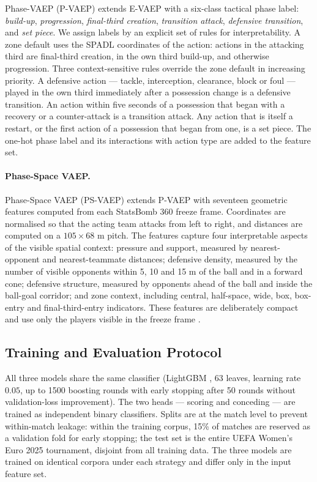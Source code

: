 \documentclass[runningheads]{llncs}
\begin{document}
Phase-VAEP (P-VAEP) extends E-VAEP with a six-class tactical phase label: \emph{build-up}, \emph{progression}, \emph{final-third creation}, \emph{transition attack}, \emph{defensive transition}, and \emph{set piece}. We assign labels by an explicit set of rules for interpretability. A zone default uses the SPADL coordinates of the action: actions in the attacking third are final-third creation, in the own third build-up, and otherwise progression. Three context-sensitive rules override the zone default in increasing priority. A defensive action --- tackle, interception, clearance, block or foul --- played in the own third immediately after a possession change is a defensive transition. An action within five seconds of a possession that began with a recovery or a counter-attack is a transition attack. Any action that is itself a restart, or the first action of a possession that began from one, is a set piece. The one-hot phase label and its interactions with action type are added to the feature set.

\paragraph{\textbf{Phase-Space VAEP.}}
\label{sec:spatial}

Phase-Space VAEP (PS-VAEP) extends P-VAEP with seventeen geometric features computed from each StatsBomb 360 freeze frame. Coordinates are normalised so that the acting team attacks from left to right, and distances are computed on a $105 \times 68$ m pitch. The features capture four interpretable aspects of the visible spatial context: pressure and support, measured by nearest-opponent and nearest-teammate distances; defensive density, measured by the number of visible opponents within 5, 10 and 15 m of the ball and in a forward cone; defensive structure, measured by opponents ahead of the ball and inside the ball-goal corridor; and zone context, including central, half-space, wide, box, box-entry and final-third-entry indicators. These features are deliberately compact and use only the players visible in the freeze frame \cite{statsbomb2021freezeframe}.


\subsection{Training and Evaluation Protocol}

All three models share the same classifier (LightGBM \cite{ke2017lightgbm}, 63 leaves, learning rate $0.05$, up to 1500 boosting rounds with early stopping after 50 rounds without validation-loss improvement). The two heads --- scoring and conceding --- are trained as independent binary classifiers. Splits are at the match level to prevent within-match leakage: within the training corpus, 15\% of matches are reserved as a validation fold for early stopping; the test set is the entire UEFA Women's Euro 2025 tournament, disjoint from all training data. The three models are trained on identical corpora under each strategy and differ only in the input feature set.
\end{document}
